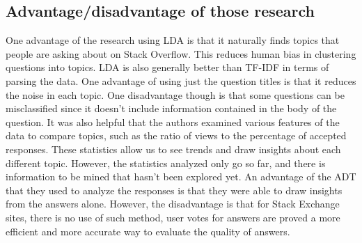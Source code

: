 \subsection{Advantage/disadvantage of those research}
	One advantage of the research using LDA is that it naturally finds topics that people are asking about on Stack Overflow. This reduces human bias in clustering questions into topics. LDA is also generally better than TF-IDF in terms of parsing the data. One advantage of using just the question titles is that it reduces the noise in each topic. One disadvantage though is that some questions can be misclassified since it doesn’t include information contained in the body of the question. It was also helpful that the authors examined various features of the data to compare topics, such as the ratio of views to the percentage of accepted responses. These statistics allow us to see trends and draw insights about each different topic. However, the statistics analyzed only go so far, and there is information to be mined that hasn’t been explored yet. An advantage of the ADT that they used to analyze the responses is that they were able to draw insights from the answers alone. However,  the disadvantage is that for Stack Exchange sites, there is no use of such method, user votes for answers are proved a more efficient and more accurate way to evaluate the quality of answers.
	
